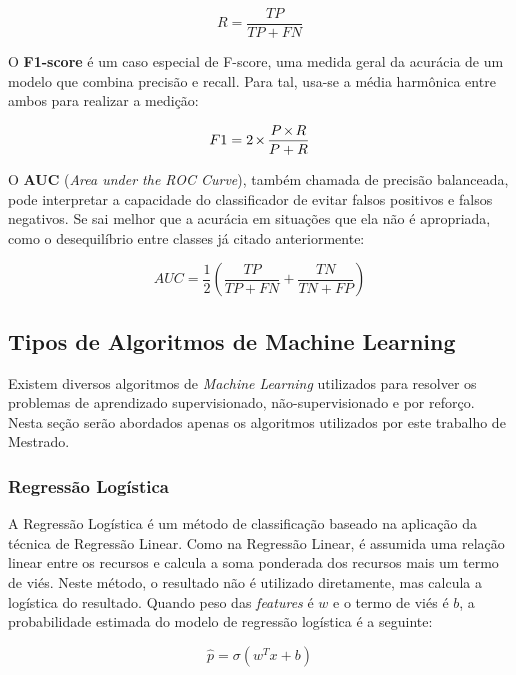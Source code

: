 \documentclass[Portugues,Final]{ic-tese-v3}
\let\oldtimes\times
\def\times{{\mkern1mu\oldtimes\mkern1mu}}
\begin{document}
\begin{equation}
R = \frac{TP}{TP + FN}
\end{equation}

O \textbf{F1-score} é um caso especial de F-score, uma medida geral da acurácia de um modelo que combina precisão e recall. Para tal, usa-se a média harmônica entre ambos para realizar a medição:

\begin{equation}
F1 = 2 \times\frac{P \times R}{P + R}
\end{equation}

O \textbf{AUC} (\textit{Area under the ROC Curve}), também chamada de precisão balanceada, pode interpretar a capacidade do classificador de evitar falsos positivos e falsos negativos. Se sai melhor que a acurácia em situações que ela não é apropriada, como o desequilíbrio entre classes já citado anteriormente:

\begin{equation}
AUC = \frac{1}{2} \left( \frac{TP}{TP + FN} + \frac{TN}{TN + FP} \right)
\end{equation}

\subsection{Tipos de Algoritmos de Machine Learning}
\label{sec:MLAlgorithms}

Existem diversos algoritmos de \textit{Machine Learning} utilizados para resolver os problemas de aprendizado supervisionado, não-supervisionado e por reforço. Nesta seção serão abordados apenas os algoritmos utilizados por este trabalho de Mestrado.

\subsubsection{Regressão Logística}

A Regressão Logística é um método de classificação baseado na aplicação da técnica de Regressão Linear. Como na Regressão Linear, é assumida uma relação linear entre os recursos e calcula a soma ponderada dos recursos mais um termo de viés. Neste método, o resultado não é utilizado diretamente, mas calcula a logística do resultado. Quando peso das \textit{features} é $w$ e o termo de viés é $b$, a probabilidade estimada do modelo de regressão logística é a seguinte:

\begin{equation}
\hat{p} = \sigma (w^{T}x + b)
\end{equation}
\end{document}
